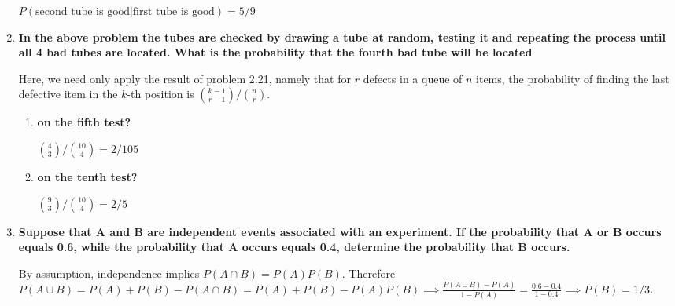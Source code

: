 \documentclass[10pt, oneside]{article}
\begin{document}
\begin{enumerate}[label=3.\arabic*]
$P(\text{second tube is good} | \text{first tube is good}) = \boxed{5/9}$

\item  \begin{tcolorbox}[
  colback=Cerulean!5!white,
  colframe=Cerulean!75!black]
\textbf{In the above problem the tubes are checked by drawing a tube at random, testing it and repeating the process until all 4 bad tubes are located. What is the probability that the fourth bad tube will be located}
\end{tcolorbox}

Here, we need only apply the result of problem 2.21, namely that for $r$ defects in a queue of $n$ items, the probability of finding the last defective item in the $k$-th position is $\binom{k-1}{r-1} / \binom{n}{r}$.

	\begin{enumerate}
	\item  \begin{tcolorbox}[
	  colback=Cerulean!5!white,
	  colframe=Cerulean!75!black]
	\textbf{on the fifth test?}
	\end{tcolorbox}
	
	$\binom{4}{3} / \binom{10}{4} = \boxed{2/105}$
	
	\item  \begin{tcolorbox}[
	  colback=Cerulean!5!white,
	  colframe=Cerulean!75!black]
	\textbf{on the tenth test?}
	\end{tcolorbox}
	
	$\binom{9}{3} / \binom{10}{4} = \boxed{2/5}$
	
	\end{enumerate}

\item  \begin{tcolorbox}[
  colback=Cerulean!5!white,
  colframe=Cerulean!75!black]
\textbf{Suppose that $\bm{A}$ and $\bm{B}$ are independent events associated with an experiment. If the probability that $\bm{A}$ or $\bm{B}$ occurs equals 0.6, while the probability that $\bm{A}$ occurs equals 0.4, determine the probability that $\bm{B}$ occurs.}
\end{tcolorbox}

By assumption, independence implies $P(A \cap B) = P(A)P(B)$. Therefore $P(A \cup B) = P(A) + P(B) - P(A \cap B) = P(A) + P(B) - P(A)P(B) \implies \frac{P(A \cup B) - P(A)}{1 - P(A)} = \frac{0.6 - 0.4}{1 - 0.4} \implies \boxed{P(B) = 1/3}$.


\end{enumerate}
\end{document}

